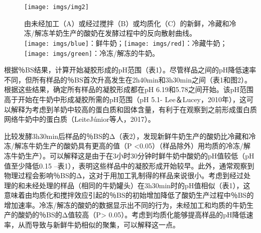 \documentclass[twocolumn]{ctexart}
\begin{document}
\begin{figure*}[!htb]
\centering
\texttt{[image: imgs/img2]}
\caption{由未经加工（A）或经过搅拌（B）或均质化（C）的新鲜，冷藏和冷冻/解冻羊奶生产的酸奶在发酵过程中的反向散射曲线。\\\texttt{[image: imgs/blue]}：鲜牛奶；\texttt{[image: imgs/red]}：冷藏牛奶； \texttt{[image: imgs/green]}：冷冻/解冻的牛奶。}
\end{figure*}

根据％BS结果，计算开始凝胶形成的pH范围（表1）。尽管样品之间的pH降低速率不同，但所有样品的％BS首次升高发生在2h40min和3h30min之间（表1和图2）。根据这些结果，确定所有样品的凝胶形成都在pH 6.19和5.78之间开始。该pH范围高于开始在牛奶中形成凝胶所需的pH范围（pH 5.1- Lee＆Lucey，2010年），这可以解释为考虑到羊奶中较高的蛋白质和固体含量，有利于在观察到之前形成蛋白质网络牛奶中的蛋白质（LeiteJúnior等人，2017）。

比较发酵3h30min后样品的％BS的Δ（表2），发现新鲜牛奶生产的酸奶比冷藏和冷冻/解冻牛奶生产的酸奶具有更高的值（P <0.05）（样品除外）用均质的冷冻/解冻牛奶生产）。可以解释这是由于在3小时30分钟时鲜牛奶中酸奶的pH值较低（pH值至少降低0.15 –表1），表明这些样品中的凝胶形成开始较早。此外，通常观察到物理过程会影响％BS的Δ，这对于用加工乳制得的样品来说很小。考虑到经过处理的和未经处理的样品（相同的牛奶罐头）在3h30min时的pH值相似（表1），这意味着由均质化和搅拌效应引起的％BS的初始增加降低了酸奶生产过程中％BS的增加速率。冷冻/解冻的酸奶的数据显示出不同的行为，未经加工和均质的牛奶生产的酸奶的％BS的Δ值较高（P> 0.05）。考虑到均质化能够提高样品的pH降低速率，从而导致与新鲜牛奶相似的聚集，可以解释这一点。
\end{document}
